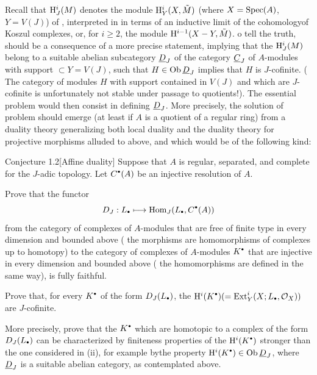 Recall that $\mathrm H^i_J (M)$ denotes the module $\mathrm H^i_Y (X, \tilde{M})$ (where $X=\operatorname{Spec} (A)$, $Y=V(J)$) of \Exp {}, interpreted in  in terms of an inductive limit of the cohomology\pageoriginale of Koszul complexes, or, for $i\ge 2$, the module $\mathrm H^{i-1} (X-Y, \tilde{M})$. o tell the truth,  should be a consequence of a more precise statement, implying that the $\mathrm H^i_J ({M})$ belong to a suitable abelian subcategory ${\underline{D}_J}$ of the category ${\underline{C}_J}$ of $A$-modules with support $\subset Y=V(J)$, such that $H\in \operatorname{Ob} {\underline{D}_J}$ implies that $H$ is $J$-cofinite. ( The category of modules $H$ with support contained in $V(J)$ and which are $J$-cofinite is unfortunately not stable under passage to quotients!). The essential problem would then consist in defining ${\underline{D}_J}$. More precisely, the solution of problem  should emerge (at least if $A$ is a quotient of a regular ring) from a duality theory generalizing both local duality and the duality theory for projective morphisms alluded to above, and which would be of the following kind:

 \label{XIII.1.2}
\begin{enonce*}{Conjecture 1.2}[\og Affine duality\fg\sfootnotemark]
 Suppose that $A$ is regular, separated, and complete for the $J$-adic topology. Let $C^{\boule}(A)$ be an injective resolution of $A$.
\begin{enumeratei}
\item
Prove that the functor
$$D_J: L_{\boule}\mto \Hom_J(L_{\boule}, C^{\boule}(A))$$
from the category of complexes of $A$-modules that are free of finite type in every dimension and bounded above ( the morphisms are homomorphisms of complexes up to homotopy) to the category of complexes of $A$-modules $K^{\boule}$ that are injective in every dimension and bounded above ( the homomorphisms are defined in the same way), is fully faithful.

\item
Prove that, for every $K^{\boule}$ of the form $D_J(L_{\boule})$, the $\H^i(K^{\boule})(= \Ext_Y^i (X; L_{\boule}, \OX))$ are $J$-cofinite.

\item
More precisely, prove that the $K^{\boule}$ which are homotopic to a complex of the form $D_J(L_{\boule})$ can be characterized by finiteness properties of the $\H^i(K^{\boule})$ stronger than the one considered in (ii), for example by\pageoriginale the property $\H^i(K^{\boule})\in \Ob {\DDJ}$, where ${\underline{D}_J}$ is a suitable abelian category, as contemplated above.
\end{enumeratei}
\end{enonce*}

